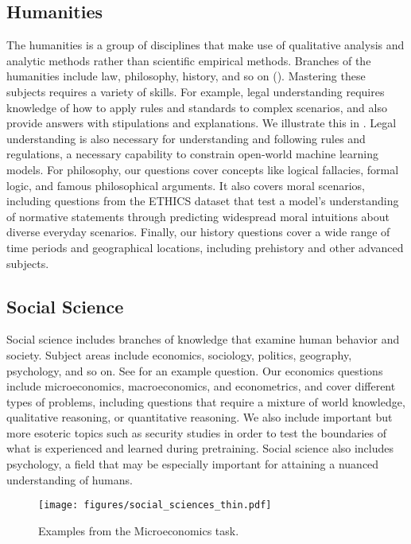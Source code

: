 \subsection{Humanities}
The humanities is a group of disciplines that make use of qualitative analysis and analytic methods rather than scientific empirical methods. Branches of the humanities include law, philosophy, history, and so on (). Mastering these subjects requires a variety of skills. For example, legal understanding requires knowledge of how to apply rules and standards to complex scenarios, and also provide answers with stipulations and explanations. We illustrate this in .
Legal understanding is also necessary for understanding and following rules and regulations, a necessary capability to constrain open-world machine learning models.
For philosophy, our questions cover concepts like logical fallacies, formal logic, and famous philosophical arguments. It also covers moral scenarios, including questions from the ETHICS dataset \citep{hendrycks2020ethicsdataset} that test a model's understanding of normative statements through predicting widespread moral intuitions about diverse everyday scenarios. Finally, our history questions cover a wide range of time periods and geographical locations, including prehistory and other advanced subjects.

\subsection{Social Science}
Social science includes branches of knowledge that examine human behavior and society. Subject areas include economics, sociology, politics, geography, psychology, and so on. See  for an example question. Our economics questions include microeconomics, macroeconomics, and econometrics, and cover different types of problems, including questions that require a mixture of world knowledge, qualitative reasoning, or quantitative reasoning.
We also include important but more esoteric topics such as security studies in order to test the boundaries of what is experienced and learned during pretraining.
Social science also includes psychology, a field that may be especially important for attaining a nuanced understanding of humans.

\begin{figure}[t]
    \centering
    \vspace{-20pt}
    \texttt{[image: figures/social\_sciences\_thin.pdf]}
    \caption{Examples from the Microeconomics task. %
    }
    \label{fig:socsci}
\end{figure}

